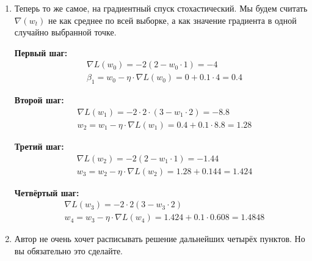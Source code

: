 \begin{sol}
\begin{enumerate}
	\item Теперь то же самое, на градиентный спуск стохастический. Мы будем считать $\nabla(w_t)$ не как среднее по всей выборке, а как значение градиента в одной случайно выбранной точке. 
	
	\textbf{Первый шаг:} 
        \begin{equation*}
        \begin{aligned}
        & \nabla L(w_0) =  -2(2 - w_0 \cdot 1) = -4 \\
        & \beta_1 = w_0 - \eta \cdot \nabla L(w_0) = 0 + 0.1 \cdot 4  = 0.4
        \end{aligned}
        \end{equation*}
    	
    \textbf{Второй шаг:} 
        \begin{equation*}
        \begin{aligned}
        & \nabla L(w_1) =  -2 \cdot 2 \cdot (3 - w_1 \cdot 2) = - 8.8 \\
        & w_2 = w_1 - \eta \cdot \nabla L(w_1) = 0.4 + 0.1 \cdot 8.8  = 1.28
        \end{aligned}
        \end{equation*}	
	
    \textbf{Третий шаг:} 
        \begin{equation*}
        \begin{aligned}
        & \nabla L(w_2) =  -2(2 - w_1 \cdot 1) = -1.44 \\
        & w_3 = w_2 - \eta \cdot \nabla L(w_2) = 1.28 + 0.144 = 1.424
        \end{aligned}
        \end{equation*}	
    	
    \textbf{Четвёртый шаг:} 
        \begin{equation*}
        \begin{aligned}
        & \nabla L(w_3) =  -2 \cdot 2(3 - w_3 \cdot 2) \\
        & w_4 = w_3 - \eta \cdot \nabla L(w_4) = 1.424 + 0.1 \cdot 0.608  = 1.4848
        \end{aligned}
        \end{equation*}	

    \item Автор не очень хочет расписывать решение дальнейших четырёх пунктов. Но вы обязательно это сделайте. 
    \end{enumerate} 
\end{sol}


